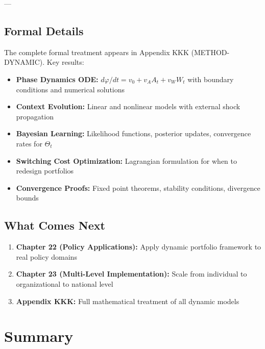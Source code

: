 ---

\subsection{Formal Details}
\label{sec:ch21-formal}

The complete formal treatment appears in Appendix KKK (METHOD-DYNAMIC). Key results:

\begin{itemize}[nosep]
    \item \textbf{Phase Dynamics ODE:} $d\varphi/dt = v_0 + v_A A_t + v_W W_t$ with boundary conditions and numerical solutions
    \item \textbf{Context Evolution:} Linear and nonlinear models with external shock propagation
    \item \textbf{Bayesian Learning:} Likelihood functions, posterior updates, convergence rates for $\Theta_t$
    \item \textbf{Switching Cost Optimization:} Lagrangian formulation for when to redesign portfolios
    \item \textbf{Convergence Proofs:} Fixed point theorems, stability conditions, divergence bounds
\end{itemize}

\subsection{What Comes Next}
\label{sec:ch21-what-comes-next}

\begin{enumerate}
    \item \textbf{Chapter 22 (Policy Applications):} Apply dynamic portfolio framework to real policy domains
    \item \textbf{Chapter 23 (Multi-Level Implementation):} Scale from individual to organizational to national level
    \item \textbf{Appendix KKK:} Full mathematical treatment of all dynamic models
\end{enumerate}


\section{Summary}
\label{sec:ch21-summary}

